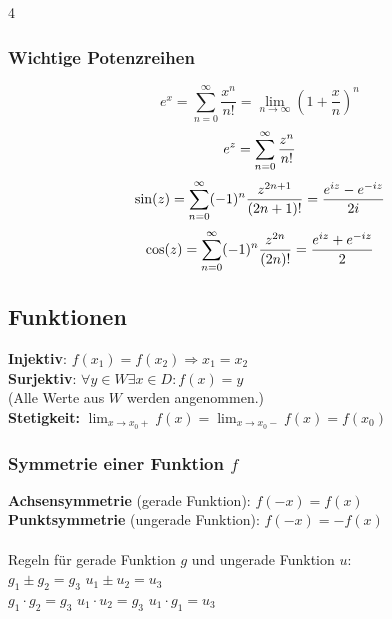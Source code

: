 \documentclass[6pt,a4paper]{scrartcl}
\newcommand{\enbrace}[1]{\ensuremath{\left(#1\right)}}
\begin{document}
\begin{multicols*}{4}
\begin{sectionbox}
        \subsubsection{Wichtige Potenzreihen}
        \label{sub:potenzreihen}
        \begin{equation*}
            e^x = \sum_{n = 0}^{\infty} \frac{x^n}{n!} = \lim\limits_{n\to\infty}\enbrace{1+\frac{x}{n}}^n
        \end{equation*}
        \begin{equation*}
            e^z = \sum_{n = 0}^{\infty} \frac{z^n}{n!} \\
        \end{equation*}
        \begin{equation*}
            \sin (z) = \sum_{n = 0}^{\infty} (-1)^n \frac{z^{2n +1}}{(2n +1)!} = \frac{e^{iz} - e^{-iz}}{2i} \\
        \end{equation*}
        \begin{equation*}
            \cos (z) = \sum_{n = 0}^{\infty} (-1)^n \frac{z^{2n}}{(2n)!} = \frac{e^{iz} + e^{-iz}}{2}\\
        \end{equation*}
    \end{sectionbox}


    \subsection{Funktionen}
    \textbf{Injektiv}: $f(x_1)=f(x_2) \Rightarrow x_1=x_2$\\
    \textbf{Surjektiv}: $\forall y\in W \exists x\in D:f(x)=y$\\ \quad (Alle Werte aus $W$ werden angenommen.)\\
    \textbf{Stetigkeit:} $\lim_{x\to x_0+}f(x)=\lim_{x\to x_0-}f(x)=f(x_0)$\\

    \subsubsection{Symmetrie einer Funktion $f$}
    \textbf{Achsensymmetrie} (gerade Funktion): $f(-x)=f(x)$\\
    \textbf{Punktsymmetrie} (ungerade Funktion): $f(-x)=-f(x)$\\
    \\
    Regeln für gerade Funktion $g$ und ungerade Funktion $u$:\\
    $g_1 \pm g_2 = g_3$ \qquad $u_1 \pm u_2 = u_3$\\
    $g_1 \cdot g_2=g_3$ \qquad $u_1 \cdot u_2 = g_3$ \qquad $u_1 \cdot g_1=u_3$


\end{multicols*}
\end{document}
